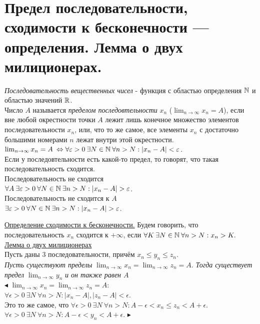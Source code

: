 \section{Предел последовательности, сходимости к бесконечности — определения. Лемма о двух
милиционерах.}

\textit{Последовательность вещественных чисел} - функция с областью определения $\mathbb{N}$ и областью значений $\mathbb{R}$.\\
Число $A$ называется \textit{пределом последовтельности} $ x_n$ ($\lim _{n \rightarrow \infty} x_n = A$), если вне любой окрестности точки $A$ лежит лишь конечное множество элементов последовательности $x_n$, или, что то же самое, все элементы $x_n$ с достаточно большими номерами $n$ лежат внутри этой окрестности.\\
$ \lim _{n \rightarrow \infty} x_n = A \:  \Leftrightarrow \forall \varepsilon > 0 \: \exists N \in \mathbb{N} \: \forall n > N: |x_n - A| < \varepsilon$.\\
Если у последовтельности есть какой-то предел, то говорят, что такая последовательность сходится. \\
Последовательность не сходится \\ $\forall A \: \exists \varepsilon > 0 \: \forall N \in \mathbb{N} \: \exists n > N: |x_n - A| > \varepsilon$. \\
Последовательность не сходится к $A$ \\
$\exists \varepsilon > 0 \: \forall N \in \mathbb{N} \: \exists n > N: |x_n - A| > \varepsilon$.

\underline{Определение сходимости к бесконечности.} Будем говорить, что последовательность $x_n$ сходится к $+\infty$, если $\forall K \: \exists N \in \mathbb{N} \: \forall n > N: x_n > K.$ \\
\underline{Лемма о двух милиционерах}\\
Пусть даны 3 последовательности, причём $x_n \leq y_n \leq z_n$.\\
\textit{Пусть существуют пределы } $\lim _{n \rightarrow \infty} x_n =  \lim _{n \rightarrow \infty} z_n = A$. \textit{Тогда существует предел} $\lim _{n \rightarrow \infty} y_n$ \textit{и он также равен $A$}\\
$\blacktriangleleft$
$\lim _{n \rightarrow \infty} x_n = \lim _{n \rightarrow \infty} z_n = A:$\\
$\forall \epsilon > 0 \: \exists N \: \forall n > N: |x_n - A|, |z_n - A| < \epsilon.$\\
Это то же самое, что $ \forall \epsilon > 0 \: \exists N \: \forall n > N: A - \epsilon < x_n \leq z_n < A + \epsilon$.\\
$\forall \epsilon > 0 \: \exists N \: \forall n > N: A - \epsilon < y_n < A + \epsilon$.
$\blacktriangleright$
\\
\\


